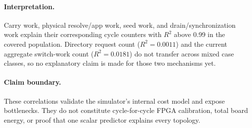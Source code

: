 \documentclass[10pt]{article}
\begin{document}
\paragraph{Interpretation.}
Carry work, physical resolve/app work, seed work, and drain/synchronization
work explain their corresponding cycle counters with $R^2$ above 0.99 in the
covered population. Directory request count ($R^2=0.0011$) and the current
aggregate switch-work count ($R^2=0.0181$) do not transfer across mixed case
classes, so no explanatory claim is made for those two mechanisms yet.

\paragraph{Claim boundary.}
These correlations validate the simulator's internal cost model and expose
bottlenecks. They do not constitute cycle-for-cycle FPGA calibration, total
board energy, or proof that one scalar predictor explains every topology.
\end{document}
